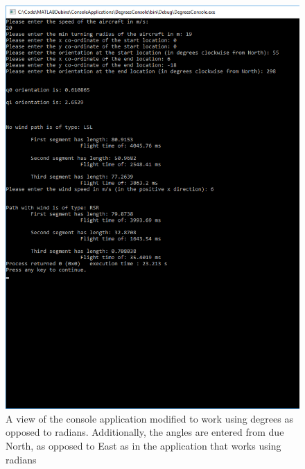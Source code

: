 \chapter{} 
\label{app:consoledegrees}

\graphicspath{{Appendix1/Figs/}}

\renewcommand{\thefigure}{A\arabic{figure}}

\setcounter{figure}{0}

\begin{figure}[htbp!] 
\centering    
\includegraphics[height=0.8\textheight]{DegreesConsole}
\caption{A view of the console application modified to work using degrees as opposed to radians. Additionally, the angles are entered from due North, as opposed to East as in the application that works using radians}
\end{figure}
